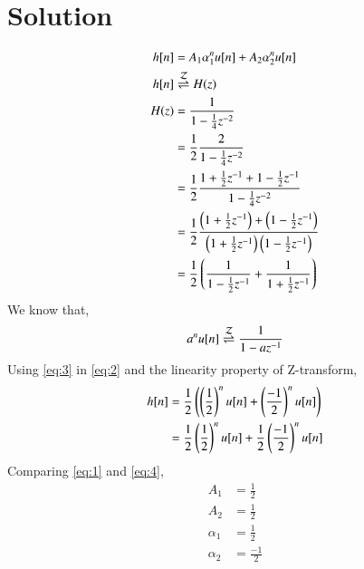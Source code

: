 \documentclass[journal,12pt,twocolumn]{IEEEtran}
\begin{document}
\section*{Solution}
\begin{align}
    h[n] &= A_1\alpha_1^nu[n] + A_2\alpha_2^nu[n]\label{eq:1}\\
    h[n] &\overset{\mathcal{Z}}{ \rightleftharpoons}{H(z)}\\
    H(z) &= \frac{1}{1 - \frac{1}{4}z^{-2}}\\
    &= \frac{1}{2}\frac{2}{1 - \frac{1}{4}z^{-2}}\\
    &= \frac{1}{2}\frac{1 + \frac{1}{2}z^{-1} + 1 - \frac{1}{2}z^{-1}}{1 - \frac{1}{4}z^{-2}}\\
    &= \frac{1}{2}\frac{\left(1 + \frac{1}{2}z^{-1}\right) + \left(1 - \frac{1}{2}z^{-1}\right)}{\left(1 + \frac{1}{2}z^{-1}\right)\left(1 - \frac{1}{2}z^{-1}\right)}\\
    &= \frac{1}{2}\left(\frac{1}{1 - \frac{1}{2}z^{-1}} + \frac{1}{1 + \frac{1}{2}z^{-1}}\right)\label{eq:2}
\end{align}
We know that,
\begin{align}
    a^nu[n] \overset{\mathcal{Z}}{ \rightleftharpoons}{\frac{1}{1 - az^{-1}}} \label{eq:3}
\end{align}
Using \eqref{eq:3} in \eqref{eq:2} and the linearity property of Z-transform,
\begin{align}
    h[n] &= \frac{1}{2}\left(\left(\frac{1}{2}\right)^nu[n] + \left(\frac{-1}{2}\right)^nu[n]\right)\\
    &= \frac{1}{2}\left(\frac{1}{2}\right)^nu[n] + \frac{1}{2}\left(\frac{-1}{2}\right)^nu[n]\label{eq:4}
\end{align}
Comparing \eqref{eq:1} and \eqref{eq:4},
\begin{align}
    A_1 &= \frac{1}{2}\\
    A_2 &= \frac{1}{2}\\
    \alpha_1 &= \frac{1}{2}\\
    \alpha_2 &= \frac{-1}{2}
\end{align}
\end{document}
